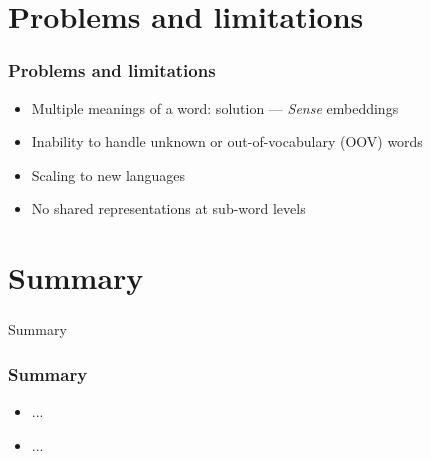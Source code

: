 
\section{Problems and limitations}


\begin{frame}
\frametitle{Problems and limitations}

	\begin{itemize}
		\item Multiple meanings of a word: solution --- \textit{Sense} embeddings
		\item Inability to handle unknown or out-of-vocabulary (OOV) words
		\item Scaling to new languages
		\item No shared representations at sub-word levels
	\end{itemize}

\end{frame}


\section{Summary}


\begin{frame}
	\frametitle{}
	
	\begin{center}
		\Huge {Summary}
	\end{center}
\end{frame}


\begin{frame}
	\frametitle{Summary}
	
	\begin{itemize}
		\item ...
		\item ...
	\end{itemize}
	
\end{frame}

